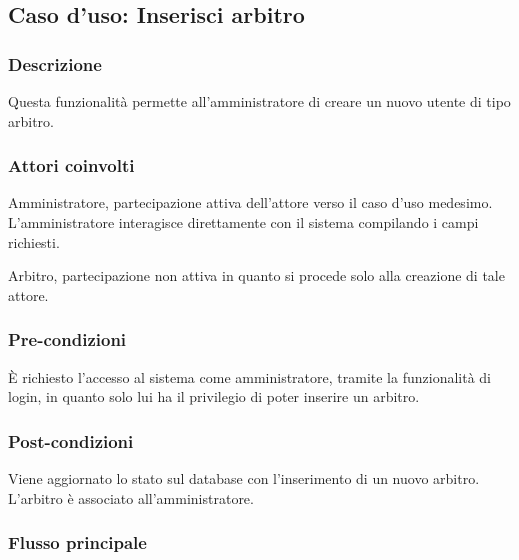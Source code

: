 \subsection{Caso d'uso: Inserisci arbitro}
\label{uc-inserisci-arbitro}

\subsubsection*{Descrizione}
Questa funzionalità permette all'amministratore di creare un nuovo utente di tipo arbitro.

\subsubsection*{Attori coinvolti}
Amministratore, partecipazione attiva dell'attore verso il caso d'uso medesimo.
L'amministratore interagisce direttamente con il sistema compilando i campi richiesti.

Arbitro, partecipazione non attiva in quanto si procede solo alla creazione di tale attore.

\subsubsection*{Pre-condizioni}
È richiesto l'accesso al sistema come amministratore, tramite la funzionalità di login, in quanto solo lui ha il privilegio di poter inserire un arbitro.

\subsubsection*{Post-condizioni}
Viene aggiornato lo stato sul database con l'inserimento di un nuovo arbitro. L'arbitro è associato all'amministratore.

\subsubsection*{Flusso principale}

